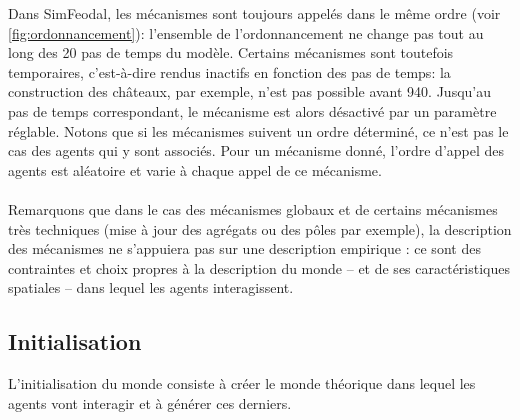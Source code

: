 \begin{tcolorbox}[breakable,left=0pt,right=0pt,top=0pt,bottom=0pt,
	colback=gray!15,colframe=gray!15,width=\dimexpr\textwidth\relax, 
	enlarge left by=0mm, boxsep=5pt,arc=0pt,outer arc=0pt]
Dans SimFeodal, les mécanismes sont toujours appelés dans le même ordre (voir \cref{fig:ordonnancement}): l'ensemble de l'ordonnancement ne change pas tout au long des 20 pas de temps du modèle.
Certains mécanismes sont toutefois temporaires, c'est-à-dire rendus inactifs en fonction des pas de temps: la construction des châteaux, par exemple, n'est pas possible avant 940.
Jusqu'au pas de temps correspondant, le mécanisme est alors désactivé par un paramètre réglable.
Notons que si les mécanismes suivent un ordre déterminé, ce n'est pas le cas des agents qui y sont associés.
Pour un mécanisme donné, l'ordre d'appel des agents est aléatoire et varie à chaque appel de ce mécanisme.

\paragraph{}
Remarquons que dans le cas des \og mécanismes globaux\fg{} et de certains mécanismes très techniques (mise à jour des agrégats ou des pôles par exemple), la description des mécanismes ne s'appuiera pas sur une description empirique : ce sont des contraintes et choix propres à la description du monde -- et de ses caractéristiques spatiales -- dans lequel les agents interagissent.
\end{tcolorbox}


\subsection{Initialisation \label{meca-init}}

L'initialisation du monde consiste à créer le monde théorique dans lequel les agents vont interagir et à générer ces derniers.

